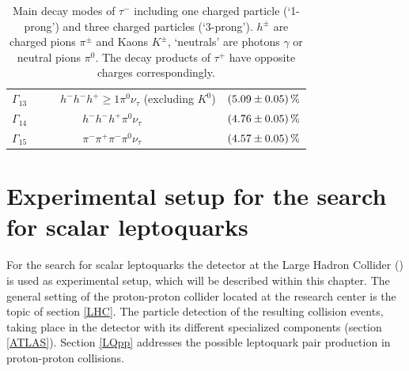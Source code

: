 \begin{table}[htbp]
\begin{tabular*}{\linewidth}{@{\extracolsep{\fill}}clc}
                \\
                $\Gamma_{13}$    & $\qquad h^-h^-h^+\geq 1\pi^0\nu_\tau$ (excluding $K^0$) & $\SI{5.09\pm0.05}{\percent}$
                \\
                $\Gamma_{14}$    & $\qquad\qquad h^-h^-h^+\pi^0\nu_\tau$                 & $\SI{4.76\pm0.05}{\percent}$
                \\
                $\Gamma_{15}$    & $\qquad\qquad \pi^-\pi^+\pi^-\pi^0\nu_\tau$           & $\SI{4.57\pm0.05}{\percent}$
                \\
		\hline
		\hline
		\end{tabular*}
		\caption[Main decay modes of $\tau^-$.]{Main decay modes of $\tau^-$ including one charged particle (`1-prong') and three charged particles (`3-prong'). $h^{\pm}$ are charged pions $\pi^\pm$ and Kaons $K^\pm$, `neutrals' are photons $\gamma$ or neutral pions $\pi^0$. The decay products of $\tau^+$ have opposite charges correspondingly. \cite{PhysRevD}}
\label{taudecays}
\end{table}
%
\chapter{Experimental setup for the search for scalar leptoquarks}\label{experiment}
For the search for scalar leptoquarks the {\ATLAS} detector at the Large Hadron Collider ({\LHC}) is used as experimental setup, which will be described within this chapter. The general setting of the proton-proton collider located at the {\CERN} research center is the topic of section \ref{LHC}. The particle detection of the resulting collision events, taking place in the {\ATLAS} detector with its different specialized components (section \ref{ATLAS}). Section \ref{LQpp} addresses the possible leptoquark pair production in proton-proton collisions.  
